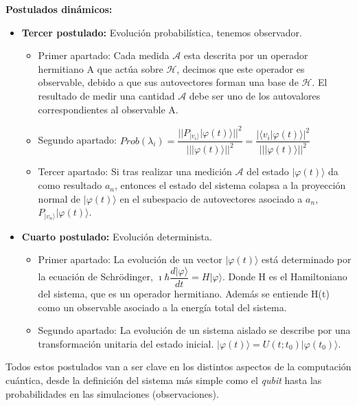 \textbf{Postulados dinámicos:}
\begin{itemize}
    \item \textbf{Tercer postulado:} Evolución probabilística, tenemos observador.
        \begin{itemize}
            \item Primer apartado: Cada medida $\mathscr{A}$ esta descrita por un operador hermitiano A que actúa sobre $\mathscr{H}$, decimos que este operador es observable, debido a que sus autovectores forman una base de $\mathscr{H}$. El resultado de medir una cantidad $\mathscr{A}$ debe ser uno de los autovalores correspondientes al observable A.
            \vspace{10pt}
            \item Segundo apartado: $Prob(\lambda_{i}) =  \dfrac{|| P_{|v_{i}\rangle} | \varphi (t) \rangle||^{2}}{||| \varphi (t) \rangle||^{2}} = \dfrac{| \langle  v_{i}  |  \varphi (t)  \rangle |^{2}}{||| \varphi (t) \rangle||^{2}}$
            \vspace{10pt}
            \item Tercer apartado: Si tras realizar una medición $\mathscr{A}$ del estado $|\varphi(t) \rangle$ da como resultado $a_{n}$, entonces el estado del sistema colapsa a la proyección normal de $|\varphi(t) \rangle$ en el subespacio de autovectores asociado a $a_{n}$,  $P_{|v_{n} \rangle} | \varphi (t) \rangle$.
        \end{itemize}
        
        \vspace{5pt}
    \item \textbf{Cuarto postulado:} Evolución determinista.
        \begin{itemize}
            \item Primer apartado: La evolución de un vector $| \varphi (t) \rangle$ está determinado por la ecuación de Schrödinger, $\imath \hbar \dfrac{d|\varphi\rangle}{dt}=H |\varphi\rangle$. Donde H es el Hamiltoniano del sistema, que es un operador hermitiano. Además se entiende H(t) como un observable asociado a la energía total del sistema.
            \item Segundo apartado: La evolución de un sistema aislado se describe por una transformación unitaria del estado inicial. $| \varphi (t) \rangle = U(t;t_{0})  | \varphi (t_{0}) \rangle$.
        \end{itemize}
\end{itemize}

Todos estos postulados van a ser clave en los distintos aspectos de la computación cuántica, desde la definición del sistema más simple como el \textit{qubit} hasta las probabilidades en las simulaciones (observaciones).

